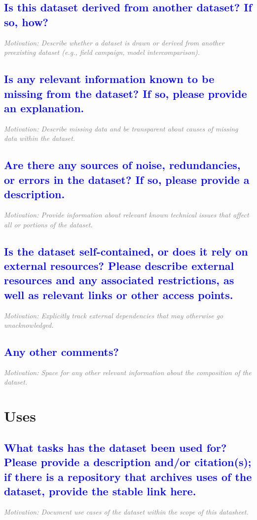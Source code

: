 \documentclass[letterpaper, 10 pt, transmag]{IEEEtran}
\begin{document}
\textcolor{blue}{\subsection{Is this dataset derived from another dataset? If so, how?}} 
\textcolor{gray}{\textit{Motivation: Describe whether a dataset is drawn or derived from another preexisting dataset (e.g., field campaign, model intercomparison).}}

\textcolor{blue}{\subsection{Is any relevant information known to be missing from the dataset? If so, please provide an explanation.}}
\textcolor{gray}{\textit{Motivation: Describe missing data and be transparent about causes of missing data within the dataset.}}

\textcolor{blue}{\subsection{Are there any sources of noise, redundancies, or errors in the dataset? If so, please provide a description.}}
\textcolor{gray}{\textit{Motivation: Provide information about relevant known technical issues that affect all or portions of the dataset.}}

\textcolor{blue}{\subsection{Is the dataset self-contained, or does it rely on external resources? Please describe external resources and any associated restrictions, as well as relevant links or other access points.}}
\textcolor{gray}{\textit{Motivation: Explicitly track external dependencies that may otherwise go unacknowledged.}}

\textcolor{blue}{\subsection{Any other comments?}}
\textcolor{gray}{\textit{Motivation: Space for any other relevant information about the composition of the dataset.}}  
\vspace{10mm}

\section{Uses}

\textcolor{blue}{\subsection{What tasks has the dataset been used for? Please provide a description and/or citation(s); if there is a repository that archives uses of the dataset, provide the stable link here.}}
\textcolor{gray}{\textit{Motivation: Document use cases of the dataset within the scope of this datasheet.}}
\end{document}

